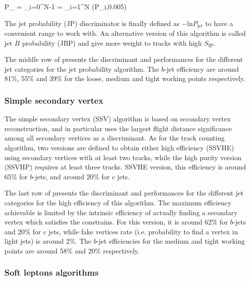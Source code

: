     {
        P_ = \Pi \cdot \sum_{i=0}^{N-1}   \Pi = \prod_{i=1}^{N} (P_{i},0.005)
    }

    The jet probability (JP) discriminator is finally defined as $- \text{ln} P_\text{jet}$
    to have a convenient range to work with. An alternative version of this algorithm is
    called jet $B$ probability (JBP) and give more weight to tracks with high $S_\text{IP}$.

    The middle row of  presents the discriminant and
    performances for the different jet categories for the jet probability algorithm. The
    $b$-jet efficiency are around 81\%, 55\% and 39\% for the loose, medium and tight
    working points respectively.

        \subsubsection{Simple secondary vertex}

    The simple secondary vertex (SSV) algorithm is based on secondary vertex reconstruction,
    and in particular uses the largest flight distance significance among all secondary
    vertices as a discriminant. As for the track counting algorithm, two versions are defined
    to obtain either high efficiency (SSVHE) using secondary vertices with at least two
    tracks, while the high purity version (SSVHP) requires at least three tracks.
    SSVHE version, this efficiency is around 65\% for $b$-jets, and around 20\% for $c$ jets.

    The last row of  presents the discriminant and
    performances for the different jet categories for the high efficiency of this algorithm.
    The maximum efficiency achievable is limited by the intrinsic efficiency of
    actually finding a secondary vertex which satisfies the constrains. For this version,
    it is around 62\% for $b$-jets and 20\% for $c$ jets, while fake vertices rate (i.e.
    probability to find a vertex in light jets) is around 2\%. The $b$-jet efficiencies
    for the medium and tight working points are around 58\% and 20\% respectively.

        \subsubsection{Soft leptons algorithms}

